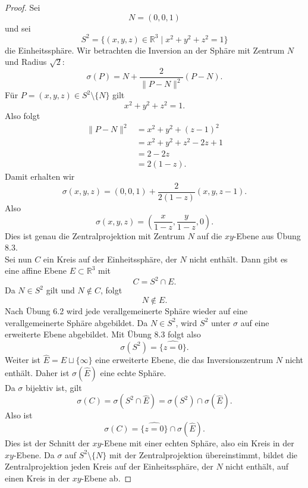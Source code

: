 \begin{proof}
    Sei
    \[
    N=(0,0,1)
    \]
    und sei
    \[
    S^2=\{(x,y,z)\in\mathbb R^3\mid x^2+y^2+z^2=1\}
    \]
    die Einheitssphäre.
    Wir betrachten die Inversion an der Sphäre mit Zentrum $N$ und Radius
    $\sqrt 2$:
    \[
    \sigma(P)
    =
    N+\frac{2}{\|P-N\|^2}(P-N).
    \]
    Für $P=(x,y,z)\in S^2\setminus\{N\}$ gilt
     \[
    x^2+y^2+z^2=1.
    \]
    Also folgt
    \begin{align*}
        \|P-N\|^2
        &=
        x^2+y^2+(z-1)^2\\
        &=
        x^2+y^2+z^2-2z+1\\
        &=
        2-2z\\
        &=
        2(1-z).
    \end{align*}
    Damit erhalten wir
    \[
    \sigma(x,y,z)
    =
    (0,0,1)+\frac{2}{2(1-z)}(x,y,z-1).
    \]
    Also
    \[
    \sigma(x,y,z)
    =
    \left(
    \frac{x}{1-z},
    \frac{y}{1-z},
    0
    \right).
    \]
    Dies ist genau die Zentralprojektion mit Zentrum $N$ auf die $xy$-Ebene aus Übung 8.3.\\
    Sei nun $C$ ein Kreis auf der Einheitssphäre, der $N$ nicht enthält. Dann
    gibt es eine affine Ebene $E\subset\mathbb R^3$ mit
    \[
    C=S^2\cap E.
    \]
    Da $N\in S^2$ gilt und $N\notin C$, folgt
    \[
    N\notin E.
    \]
    Nach Übung 6.2 wird jede verallgemeinerte
    Sphäre wieder auf eine verallgemeinerte Sphäre abgebildet.
    Da $N \in S^2$, wird
    $S^2$ unter $\sigma$ auf eine erweiterte Ebene abgebildet. Mit Übung 8.3 folgt also
    \[
    \sigma(S^2)=\widehat{\{z=0\}}.
    \]
    Weiter ist $\widehat E=E\sqcup\{\infty\}$ eine erweiterte Ebene, die das
    Inversionszentrum $N$ nicht enthält. Daher ist $\sigma(\widehat E)$
    eine echte Sphäre.\\
    Da $\sigma$ bijektiv ist, gilt
    \[
    \sigma(C)
    =
    \sigma(S^2\cap \widehat E)
    =
    \sigma(S^2)\cap \sigma(\widehat E).
    \]
    Also ist
    \[
    \sigma(C)
    =
    \widehat{\{z=0\}}\cap \sigma(\widehat E).
    \]
    Dies ist der Schnitt der $xy$-Ebene mit einer echten Sphäre, also ein Kreis
    in der $xy$-Ebene.
    Da $\sigma$ auf $S^2\setminus\{N\}$ mit der Zentralprojektion übereinstimmt,
    bildet die Zentralprojektion jeden Kreis auf der Einheitssphäre, der $N$
    nicht enthält, auf einen Kreis in der $xy$-Ebene ab.
\end{proof}